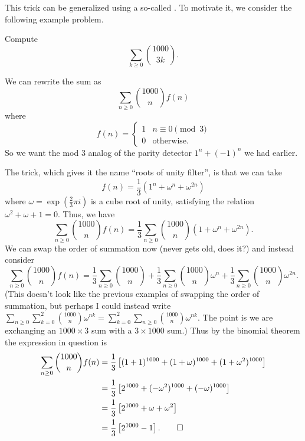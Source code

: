 \documentclass[11pt]{scrartcl}
\begin{document}
This trick can be generalized using a so-called .
To motivate it, we consider the following example problem.
\begin{example}
  Compute
  \[ \sum_{k \ge 0} \binom{1000}{3k}. \]
\end{example}
\begin{soln}
  We can rewrite the sum as
  \[ \sum_{n \ge 0} \binom{1000}{n} f(n) \]
  where
  \[ f(n) = \begin{cases}
      1 & n \equiv 0 \pmod 3 \\
      0 & \text{otherwise}.
    \end{cases} \]
  So we want the mod $3$ analog of the parity detector $1^n + (-1)^n$ we had earlier.

  The trick, which gives it the name ``roots of unity filter'',
  is that we can take
  \[ f(n) = \frac{1}{3} \left( 1^n + \omega^n + \omega^{2n} \right) \]
  where $\omega = \exp\left( \frac23\pi i \right)$ is a cube root of unity,
  satisfying the relation $\omega^2 + \omega + 1 = 0$.
  Thus, we have
  \[
    \sum_{n \ge 0} \binom{1000}{n} f(n)
    = \frac13 \sum_{n \ge 0} \binom{1000}{n} (1+\omega^{n}+\omega^{2n}).
  \]
  We can swap the order of summation now
  (never gets old, does it?)
  and instead consider
  \[
    \sum_{n \ge 0} \binom{1000}{n} f(n)
    = \frac13 \sum_{n \ge 0} \binom{1000}{n}
    + \frac13 \sum_{n \ge 0} \binom{1000}{n} \omega^n
    + \frac13 \sum_{n \ge 0} \binom{1000}{n} \omega^{2n}.
  \]
  (This doesn't look like the previous examples of swapping the order
  of summation, but perhaps I could instead write
  $\sum_{n \ge 0} \sum_{k=0}^2 \binom{1000}{n} \omega^{nk}
  = \sum_{k=0}^2 \sum_{n \ge 0} \binom{1000}{n} \omega^{nk}$.
  The point is we are exchanging an $1000 \times 3$ sum
  with a $3 \times 1000$ sum.)
  Thus by the binomial theorem the expression in question is
  \begin{align*}
    \sum_{n \ge 0} \binom{1000}{n} f(n) &= \frac13
    \left[ (1+1)^{1000} + (1+\omega)^{1000} + (1+\omega^2)^{1000} \right] \\
    &= \frac13
    \left[ 2^{1000} + (-\omega^2)^{1000} + (-\omega)^{1000} \right] \\
    &= \frac13
    \left[ 2^{1000} + \omega + \omega^2 \right] \\
    &= \frac13 \left[ 2^{1000} - 1 \right]. \qedhere
  \end{align*}
\end{soln}
\end{document}
